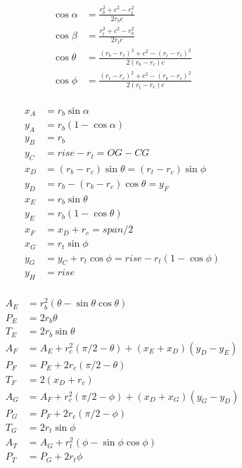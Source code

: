 \begin{equation}
\begin{aligned}
\cos\alpha &= \frac{r_b^2 + c^2 - r_t^2}{2r_b c} \\%
\cos\beta &= \frac{r_t^2 + c^2 - r_b^2}{2r_t c} \\ %
\cos\theta &= \frac{(r_b - r_c)^2 + c^2 - (r_t - r_c)^2}{2(r_b - r_c) c} \\ %
\cos\phi &= \frac{(r_t - r_c)^2 + c^2 - (r_b - r_c)^2}{2(r_t - r_c) c}  \\%
\end{aligned}
\end{equation}

\begin{equation}
\begin{aligned}
x_A & = r_b  \sin\alpha \\
y_A & = r_b  (1 - \cos\alpha) \\
y_B & = r_b \\
y_C & = rise - r_t = OG - CG \\
x_D &= (r_b -  r_c ) \sin\theta = (r_t - r_c) \sin \phi\\
y_D &= r_b - (r_b -  r_c ) \cos\theta = y_F \\
x_E & = r_b  \sin\theta \\
y_E & = r_b (1 - \cos\theta)\\
x_F & = x_D + r_c = span/2\\
x_G &= r_t \sin\phi \\
y_G &= y_C + r_t \cos\phi = rise - r_t (1 - \cos\phi) \\
y_H & = rise \\
\end{aligned}
\end{equation}

\begin{equation}
\begin{aligned}
A_E & =r_b^2(\theta - \sin \theta \cos \theta)  \\
P_E & =2  r_b \theta \\
T_E & = 2 r_b \sin \theta  \\
A_F & = A_E +   r_c^2 (\pi/2 - \theta) +  (x_E + x_D)(y_D-y_E)  \\
P_F & = P_E + 2  r_c (\pi/2 - \theta) \\
T_F & =  2 (x_D + r_c)  \\
A_G & = A_F +   r_c^2 (\pi/2 - \phi) +  (x_D + x_G)(y_G-y_D)   \\
P_G & = P_F + 2  r_c (\pi/2 - \phi) \\
T_G & =  2 r_t \sin \phi  \\
A_T & = A_G + r_t^2(\phi - \sin\phi\cos\phi) \\
P_T &= P_G + 2 r_t\phi
\end{aligned}
\end{equation}

